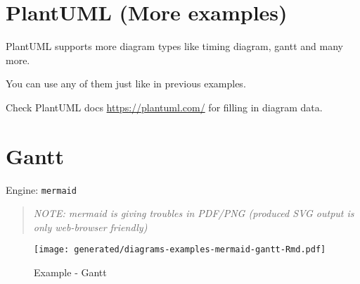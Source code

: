 \documentclass[12pt,a4paper,12pt,oneside,openany]{book}
\begin{document}
\newpage

\section{PlantUML (More examples)}\label{plantuml-more-examples}

PlantUML supports more diagram types like timing diagram, gantt and many more.

You can use any of them just like in previous examples.

Check PlantUML docs \url{https://plantuml.com/} for filling in diagram data.

\newpage

\section{Gantt}\label{gantt}

Engine: \texttt{mermaid}

\begin{quote}
\emph{NOTE: mermaid is giving troubles in PDF/PNG (produced SVG output is only web-browser friendly)}
\end{quote}

\begin{figure}
\centering
\texttt{[image: generated/diagrams-examples-mermaid-gantt-Rmd.pdf]}
\caption{Example - Gantt}
\end{figure}


\end{document}
